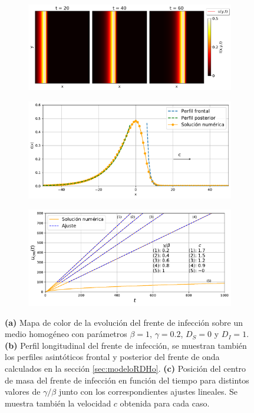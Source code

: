 \begin{figure}[!h]
    \centering
    \begin{subfigure}{1\textwidth}
      \centering
      \includegraphics[width=.87\textwidth]{h_case.pdf}
      \caption{}
    \end{subfigure}
    \begin{subfigure}{1\textwidth}
      \centering
      \includegraphics[width=.87\textwidth]{f_I(x)_hom.pdf}
      \caption{}
    \end{subfigure}
    \begin{subfigure}{1\textwidth}
        \centering
        \includegraphics[width=.87\textwidth]{u_cm(t).pdf}
        \caption{}
    \end{subfigure}
    \caption[Representación del campo de infectados y evolución del centro de masa en medio H.]{\textbf{(a)} Mapa de color de la evolución del frente de infección sobre un medio homogéneo con parámetros $\beta=1$, $\gamma=0.2$, $D_S=0$ y $D_I=1$.
    \textbf{(b)} Perfil longitudinal del frente de infección, se muestran también los perfiles asintóticos frontal y posterior 
    del frente de onda calculados en la sección \ref{sec:modeloRDHo}. \textbf{(c)} Posición del centro de masa del frente de infección en función del tiempo para distintos valores de $\gamma/\beta$ junto con los correspondientes ajustes lineales. Se muestra también la velocidad $c$ obtenida para cada caso.}
    \label{fig:h_case}
\end{figure}

